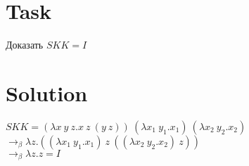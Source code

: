 \documentclass{article}
\begin{document}
\section{Task}
\Large
Доказать $S K K = I$

\section{Solution}
\begin{center}
\Large
$S K K = (\lambda x \ y \ z.x \ z \ (y \ z)) \ (\lambda x_1 \ y_1.x_1) \ (\lambda x_2 \ y_2.x_2)$ \\
$\rightarrow_{\beta} \lambda z.((\lambda x_1 \ y_1.x_1) \ z \ ((\lambda x_2 \ y_2.x_2) \ z))$ \\
$\rightarrow_{\beta} \lambda z.z = I$
\end{center}
\end{document}
